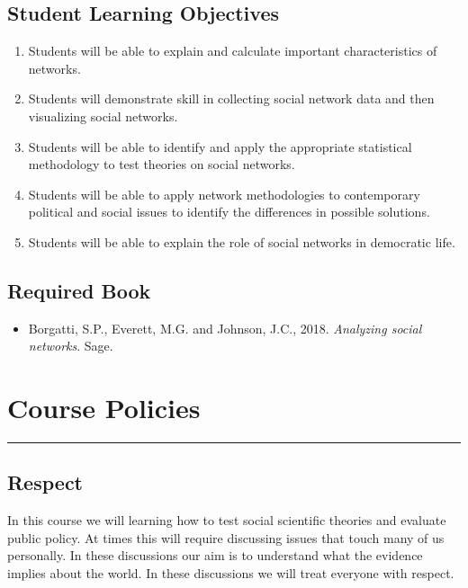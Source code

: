 \documentclass[11pt]{article}
\begin{document}
\subsection*{ \large Student Learning Objectives} 
\begin{enumerate}
	\item Students will be able to explain and calculate important characteristics of networks.
	\item Students will demonstrate skill in collecting social network data and then visualizing social networks. 
	\item Students will be able to identify and apply the appropriate statistical methodology to test theories on social networks.
	\item Students will be able to apply network methodologies to contemporary political and social issues to identify the differences in possible solutions.
	\item Students will be able to explain the role of social networks in democratic life.
\end{enumerate}

\subsection*{\large Required Book} 

\begin{itemize}
	\item[] Borgatti, S.P., Everett, M.G. and Johnson, J.C., 2018. \textit{Analyzing social networks}. Sage.
\end{itemize}


\clearpage 

\section*{\Large Course Policies} \hrule 
\vspace{.25cm}
\subsection*{Respect} In this course we will learning how to test social scientific theories and evaluate public policy. At times this will require discussing issues that touch many of us personally. In these discussions our aim is to understand what the evidence implies about the world. In these discussions we will treat everyone with respect. \\
\end{document}
